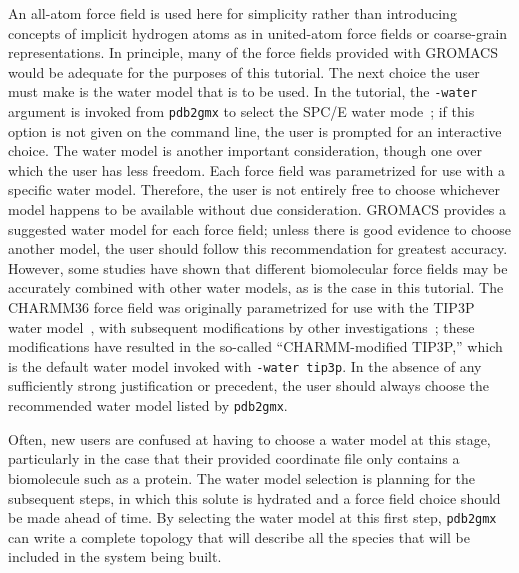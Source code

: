 \documentclass[9pt,tutorial,pubversion]{livecoms}
\begin{document}
An all-atom force field is used here for simplicity rather than introducing concepts of implicit hydrogen atoms as in united-atom force fields or coarse-grain representations. In principle, many of the force fields provided with GROMACS would be adequate for the purposes of this tutorial. The next choice the user must make is the water model that is to be used. In the tutorial, the \texttt{-water} argument is invoked from \texttt{pdb2gmx} to select the SPC/E water mode~\cite{Berendsen1987}; if this option is not given on the command line, the user is prompted for an interactive choice. The water model is another important consideration, though one over which the user has less freedom. Each force field was parametrized for use with a specific water model. Therefore, the user is not entirely free to choose whichever model happens to be available without due consideration. GROMACS provides a suggested water model for each force field; unless there is good evidence to choose another model, the user should follow this recommendation for greatest accuracy. However, some studies have shown that different biomolecular force fields may be accurately combined with other water models, as is the case in this tutorial. The CHARMM36 force field was originally parametrized for use with the TIP3P water model~\cite{Jorgensen1983}, with subsequent modifications by other investigations~\cite{Durell1994,Neria1996}; these modifications have resulted in the so-called ``CHARMM-modified TIP3P,'' which is the default water model invoked with \texttt{-water tip3p}. In the absence of any sufficiently strong justification or precedent, the user should always choose the recommended water model listed by \texttt{pdb2gmx}.

Often, new users are confused at having to choose a water model at this stage, particularly in the case that their provided coordinate file only contains a biomolecule such as a protein. The water model selection is planning for the subsequent steps, in which this solute is hydrated and a force field choice should be made ahead of time. By selecting the water model at this first step, \texttt{pdb2gmx} can write a complete topology that will describe all the species that will be included in the system being built.
\end{document}
